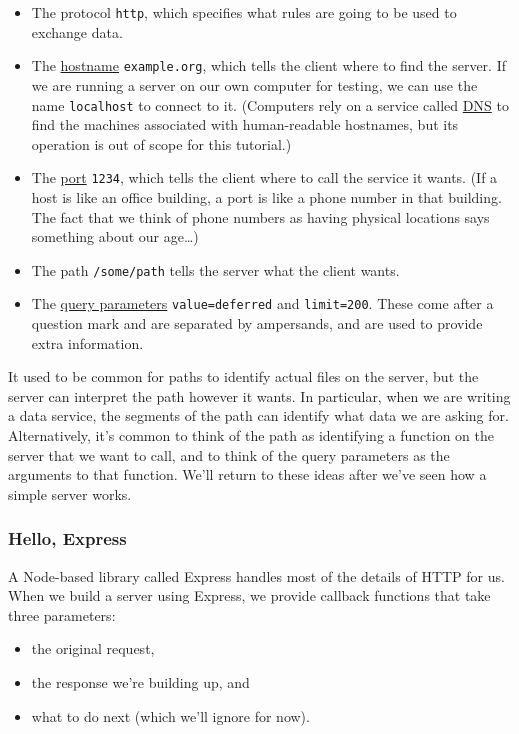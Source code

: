 \begin{itemize}
\tightlist
\item
  The protocol \texttt{http}, which specifies what rules are going to be
  used to exchange data.
\item
  The \protect\hyperlink{g:hostname}{hostname} \texttt{example.org},
  which tells the client where to find the server. If we are running a
  server on our own computer for testing, we can use the name
  \texttt{localhost} to connect to it. (Computers rely on a service
  called \protect\hyperlink{g:dns}{DNS} to find the machines associated
  with human-readable hostnames, but its operation is out of scope for
  this tutorial.)
\item
  The \protect\hyperlink{g:port}{port} \texttt{1234}, which tells the
  client where to call the service it wants. (If a host is like an
  office building, a port is like a phone number in that building. The
  fact that we think of phone numbers as having physical locations says
  something about our age\ldots{})
\item
  The path \texttt{/some/path} tells the server what the client wants.
\item
  The \protect\hyperlink{g:query-parameter}{query parameters}
  \texttt{value=deferred} and \texttt{limit=200}. These come after a
  question mark and are separated by ampersands, and are used to provide
  extra information.
\end{itemize}

It used to be common for paths to identify actual files on the server,
but the server can interpret the path however it wants. In particular,
when we are writing a data service, the segments of the path can
identify what data we are asking for. Alternatively, it's common to
think of the path as identifying a function on the server that we want
to call, and to think of the query parameters as the arguments to that
function. We'll return to these ideas after we've seen how a simple
server works.

\subsubsection{Hello, Express}\label{s:server-express}

A Node-based library called Express handles most of the details of HTTP
for us. When we build a server using Express, we provide callback
functions that take three parameters:

\begin{itemize}
\tightlist
\item
  the original request,
\item
  the response we're building up, and
\item
  what to do next (which we'll ignore for now).
\end{itemize}


